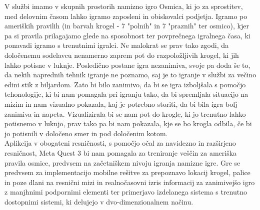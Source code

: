 \documentclass[a4paper, 12pt]{article}
\newcommand\cmnt[1]{\textcolor{munsell}{#1}}
\begin{document}
V službi imamo v skupnih prostorih namizno igro Osmica, ki jo za sprostitev, med delovnim časom lahko igramo
zaposleni in obiskovalci podjetja. Igramo po ameriških pravilih (in barvah krogel - 7 "polnih" in 7 "praznih" ter osmico), kjer pa si
pravila prilagajamo glede na sposobnost ter povprečnega igralnega časa, ki ponavadi igramo s trenutnimi igralci. Ne malokrat se prav tako
zgodi, da določenemu sodelavcu nenamerno zaprem pot do razpoložljivih krogel, ki jih lahko potisne v luknje. Posledično postane igra
nezanimiva, svoje pa doda še to, da nekih naprednih tehnik igranje ne poznamo, saj je to igranje v službi za večino edini stik z biljardom. 
Zato bi bilo zanimivo, da bi se igra izboljšala s pomočjo tehonologije, ki bi nam pomagala pri igranju tako, da bi spremljala situacijo na
mizim in nam vizualno pokazala, kaj je potrebno storiti, da bi bila igra bolj zanimiva in napeta. Vizualizirala bi se nam pot do 
krogle, ki jo trenutno lahko potisnemo v luknjo, prav tako pa bi nam pokazala, kje se bo krogla odbila, 
če bi jo potisnili v določeno smer in pod določenim kotom. \\Aplikcija v obogateni resničnosti, s pomočjo
očal za navidezno in razširjeno resničnost, Meta Quest 3 bi nam pomagala za treniranje veščin za 
ameriška pravila osmice, predvsem na začetniškem nivoju igranja namizne igre. Gre se predvsem za implementacijo
mobilne rešitve za prepoznavo lokacij krogel, palice in poze dlani na resnični mizi in realnočasovni izris informacij
za zanimivejšo igro z manjhnimi podpornimi elementi ter primerjavo izdelanega sistema s trenutno dostopnimi sistemi,
ki delujejo v dvo-dimenzionalnem načinu.

\newpage
\end{document}
